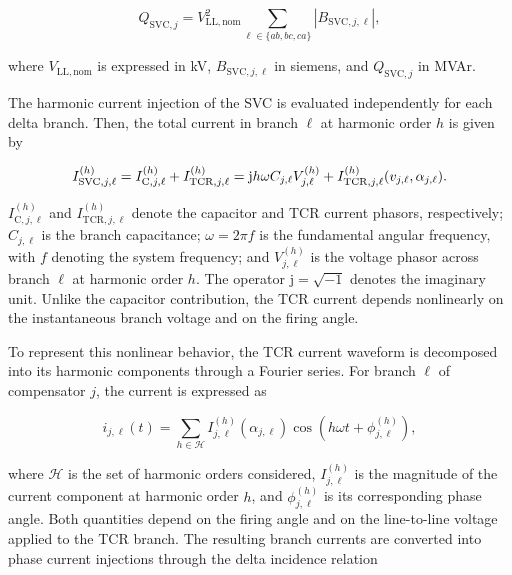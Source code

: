 \documentclass[journal]{IEEEtran}
\begin{document}
\begin{equation}
    Q_{\mathrm{SVC},j} = V_{\mathrm{LL,nom}}^2
    \sum_{\ell \in \{ab,bc,ca\}} \left|B_{\mathrm{SVC},j,\ell}\right|,
    \label{eq:svc_rating}
\end{equation}

\noindent where $V_{\mathrm{LL,nom}}$ is expressed in kV,
$B_{\mathrm{SVC},j,\ell}$ in siemens, and $Q_{\mathrm{SVC},j}$ in MVAr.


The harmonic current injection of the SVC is evaluated independently for
each delta branch. Then, the total current in branch $\ell$
at harmonic order $h$ is given by

\begin{equation}\small
    I_{\mathrm{SVC},j,\ell}^{(h)}
    =I_{\mathrm{C},j,\ell}^{(h)}+I_{\mathrm{TCR},j,\ell}^{(h)}
    =\mathrm{j}h\omega C_{j,\ell}V_{j,\ell}^{(h)}+
    I_{\mathrm{TCR},j,\ell}^{(h)}(v_{j,\ell},\alpha_{j,\ell}).
    \label{eq:svc_branch_current}
\end{equation}

 $I_{\mathrm{C},j,\ell}^{(h)}$ and
$I_{\mathrm{TCR},j,\ell}^{(h)}$ denote the capacitor and TCR current
phasors, respectively; $C_{j,\ell}$ is the branch capacitance;
$\omega=2\pi f$ is the fundamental angular frequency, with $f$ denoting
the system frequency; and $V_{j,\ell}^{(h)}$ is the voltage
phasor across branch $\ell$ at harmonic order $h$. The operator
$\mathrm{j}=\sqrt{-1}$ denotes the imaginary unit. Unlike the 
capacitor contribution, the TCR current depends nonlinearly on the
instantaneous branch voltage and on the firing angle.

To represent this nonlinear behavior, the TCR current waveform is
decomposed into its harmonic components through a Fourier series. For
branch $\ell$ of compensator $j$, the current is expressed as

\begin{equation}
    i_{j,\ell}(t)=
    \sum_{h\in\mathcal{H}}
    I_{j,\ell}^{(h)}(\alpha_{j,\ell})
    \cos\!\left(h\omega t+\phi_{j,\ell}^{(h)}\right),
    \label{eq:tcr_fourier}
\end{equation}

\noindent where $\mathcal{H}$ is the set of harmonic orders considered,
$I_{j,\ell}^{(h)}$ is the magnitude of the current component at harmonic
order $h$, and $\phi_{j,\ell}^{(h)}$ is its corresponding phase angle.
Both quantities depend on the firing angle and on the line-to-line voltage
applied to the TCR branch. The resulting branch currents are converted
into phase current injections through the delta incidence relation
\end{document}
